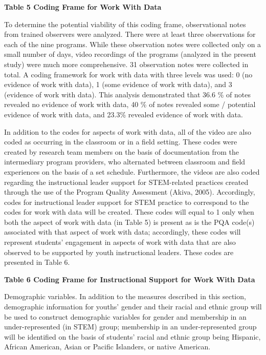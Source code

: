 \documentclass[]{msu-thesis}
\theoremstyle{definition}
\theoremstyle{definition}
\theoremstyle{definition}
\theoremstyle{remark}
\begin{document}
\textbf{Table 5 Coding Frame for Work With Data}

To determine the potential viability of this coding frame, observational
notes from trained observers were analyzed. There were at least three
observations for each of the nine programs. While these observation
notes were collected only on a small number of days, video recordings of
the programs (analyzed in the present study) were much more
comprehensive. 31 observation notes were collected in total. A coding
framework for work with data with three levels was used: 0 (no evidence
of work with data), 1 (some evidence of work with data), and 3 (evidence
of work with data). This analysis demonstrated that 36.6 \% of notes
revealed no evidence of work with data, 40 \% of notes revealed some /
potential evidence of work with data, and 23.3\% revealed evidence of
work with data.

In addition to the codes for aspects of work with data, all of the video
are also coded as occurring in the classroom or in a field setting.
These codes were created by research team members on the basis of
documentation from the intermediary program providers, who alternated
between classroom and field experiences on the basis of a set schedule.
Furthermore, the videos are also coded regarding the instructional
leader support for STEM-related practices created through the use of the
Program Quality Assessment (Akiva, 2005). Accordingly, codes for
instructional leader support for STEM practice to correspond to the
codes for work with data will be created. These codes will equal to 1
only when both the aspect of work with data (in Table 5) is present as
is the PQA code(s) associated with that aspect of work with data;
accordingly, these codes will represent students' engagement in aspects
of work with data that are also observed to be supported by youth
instructional leaders. These codes are presented in Table 6.

\textbf{Table 6 Coding Frame for Instructional Support for Work With
Data}

Demographic variables. In addition to the measures described in this
section, demographic information for youths' gender and their racial and
ethnic group will be used to construct demographic variables for gender
and membership in an under-represented (in STEM) group; membership in an
under-represented group will be identified on the basis of students'
racial and ethnic group being Hispanic, African American, Asian or
Pacific Islanders, or native American.
\end{document}
